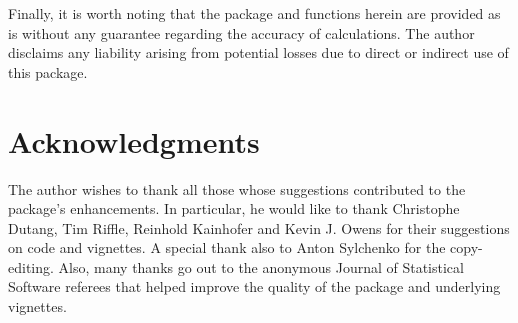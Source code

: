 \documentclass[nojss]{jss}
\begin{document}
Finally, it is worth noting that the package and functions herein are
provided as is without any guarantee regarding the accuracy of
calculations. The author disclaims any liability arising from
potential losses due to direct or indirect use of this package.


\section*{Acknowledgments}\label{sec:acknowledgments}

The author wishes to thank all those whose suggestions contributed to
the package's enhancements. In particular, he would like to thank
Christophe Dutang, Tim Riffle, Reinhold Kainhofer and Kevin J. Owens for their
suggestions on code and vignettes. A special thank also to Anton Sylchenko for the
copy-editing. Also, many thanks go out to the anonymous Journal of
Statistical Software referees that helped improve the quality of the
package and underlying vignettes.

%

\end{document}
